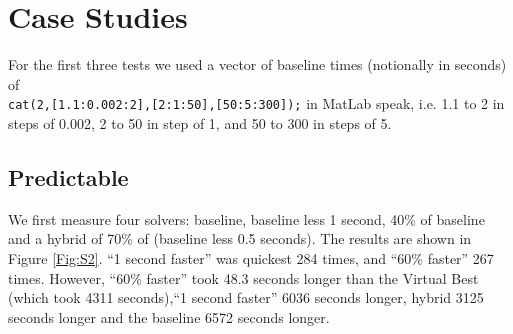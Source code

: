 \documentclass{easychair}
\begin{document}
\section{Case Studies}
For the first three tests we used a vector of baseline times (notionally in seconds) of \\\verb+cat(2,[1.1:0.002:2],[2:1:50],[50:5:300]);+ in MatLab speak, i.e. 1.1 to 2 in steps of 0.002, 2 to 50 in step of 1, and 50 to 300 in steps of 5. 
\subsection{Predictable}\label{sec:Pr}
We first measure four solvers: baseline, baseline less 1 second, 40\% of baseline and a hybrid of 70\% of (baseline less 0.5 seconds). The results are shown in Figure \ref{Fig:S2}. ``1 second faster'' was quickest 284 times, and ``60\% faster'' 267 times. However, ``60\% faster'' took 48.3 seconds longer than the Virtual Best (which took 4311 seconds),``1 second faster'' 6036 seconds longer, hybrid  3125 seconds longer and the baseline 6572 seconds longer.
\end{document}
